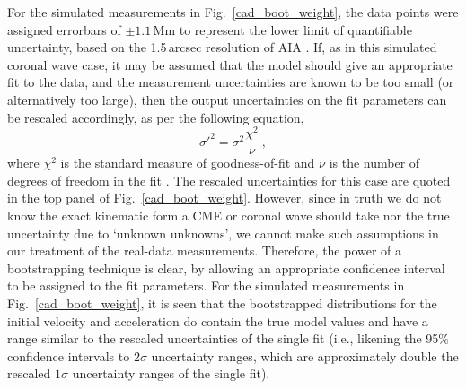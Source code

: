 \documentclass[referee]{aa}
\begin{document}
For the simulated measurements in Fig.~\ref{cad_boot_weight}, the data points were assigned errorbars of $\pm1.1$\,Mm to represent the lower limit of quantifiable uncertainty, based on the 1.5\,arcsec resolution of AIA \citep{2012SoPh..275...17L}. If, as in this simulated coronal wave case, it may be assumed that the model should give an appropriate fit to the data, and the measurement uncertainties are known to be too small (or alternatively too large), then the output uncertainties on the fit parameters can be rescaled accordingly, as per the following equation,
\begin{equation}
\sigma'^2 = \sigma^2 \frac{\chi^2}{\nu} \ ,
\end{equation}
where $\chi^2$ is the standard measure of goodness-of-fit and $\nu$ is the number of degrees of freedom in the fit \citep[see, for example,][]{2003drea.book.....B}. The rescaled uncertainties for this case are quoted in the top panel of Fig.~\ref{cad_boot_weight}. However, since in truth we do not know the exact kinematic form a CME or coronal wave should take nor the true uncertainty due to `unknown unknowns', we cannot make such assumptions in our treatment of the real-data measurements. Therefore, the power of a bootstrapping technique is clear, by allowing an appropriate confidence interval to be assigned to the fit parameters. For the simulated measurements in Fig.~\ref{cad_boot_weight}, it is seen that the bootstrapped distributions for the initial velocity and acceleration do contain the true model values and have a range similar to the rescaled uncertainties of the single fit (i.e., likening the 95\% confidence intervals to $2\sigma$ uncertainty ranges, which are approximately double the rescaled $1\sigma$ uncertainty ranges of the single fit).
\end{document}
